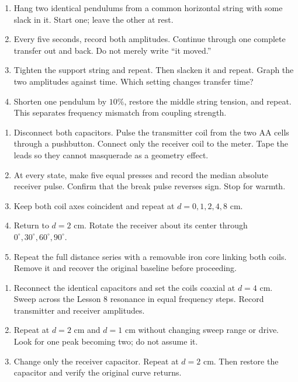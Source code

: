 \begin{enumerate}
\item Hang two identical pendulums from a common horizontal string with some
  slack in it. Start one; leave the other at rest.
\item Every five seconds, record both amplitudes. Continue through one complete
  transfer out and back. Do not merely write “it moved.”
\item Tighten the support string and repeat. Then slacken it and repeat. Graph
  the two amplitudes against time. Which setting changes transfer time?
\item Shorten one pendulum by \(10\%\), restore the middle string tension, and
  repeat. This separates frequency mismatch from coupling strength.
\end{enumerate}

\begin{enumerate}
\item Disconnect both capacitors. Pulse the transmitter coil from the two AA
  cells through a pushbutton. Connect only the receiver coil to the meter.
  Tape the leads so they cannot masquerade as a geometry effect.
\item At every state, make five equal presses and record the median absolute
  receiver pulse. Confirm that the break pulse reverses sign. Stop for warmth.
\item Keep both coil axes coincident and repeat at \(d=0,1,2,4,8\) cm.
\item Return to \(d=2\) cm. Rotate the receiver about its center through
  \(0^\circ,30^\circ,60^\circ,90^\circ\).
\item Repeat the full distance series with a removable iron core linking both
  coils. Remove it and recover the original baseline before proceeding.
\end{enumerate}

\begin{enumerate}
\item Reconnect the identical capacitors and set the coils coaxial at \(d=4\)
  cm. Sweep across the Lesson 8 resonance in equal frequency steps. Record
  transmitter and receiver amplitudes.
\item Repeat at \(d=2\) cm and \(d=1\) cm without changing sweep range or drive.
  Look for one peak becoming two; do not assume it.
\item Change only the receiver capacitor. Repeat at \(d=2\) cm. Then restore
  the capacitor and verify the original curve returns.
\end{enumerate}

